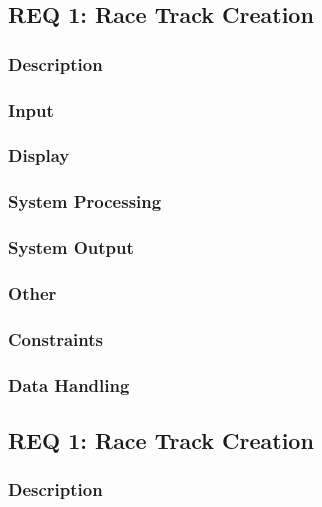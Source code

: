 \documentclass[a4paper, 11pt]{article} %
\begin{document}
\newpage

\subsection{REQ 1: Race Track Creation}

\subsubsection{Description}

\subsubsection{Input}

\subsubsection{Display}

\subsubsection{System Processing}

\subsubsection{System Output}

\subsubsection{Other}

\subsubsection{Constraints}

\subsubsection{Data Handling}

\newpage

\subsection{REQ 1: Race Track Creation}

\subsubsection{Description}
\end{document}
